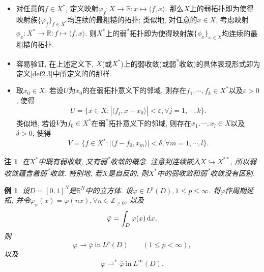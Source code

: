 \documentclass[12pt,a4paper]{article}
\newtheorem{example}[theorem]{例}
\newtheorem{remark}[theorem]{注}
\begin{document}
\begin{itemize}
    \item 对任意的$f \in X^*$, 定义映射$\varphi_f\colon X \rightarrow \mathbb{R}\colon x \mapsto \langle f, x\rangle$.
    那么$X$上的弱拓扑即为使得映射族$\{\varphi_f\}_{f \in X^*}$均连续的最粗糙的拓扑; 类似地, 对任意的$x \in X$, 考虑映射$\phi_x\colon X^* \rightarrow \mathbb{R}\colon f \mapsto \langle f, x\rangle$.
    则$X^*$上的弱\textsuperscript{*}拓扑即为使得映射族$\{\phi_x\}_{x \in X}$均连续的最粗糙的拓扑.
    \item 容易验证, 在上述定义下, $X$(或$X^*$)上的弱收敛(或弱\textsuperscript{*}收敛)的具体表现形式即为定义\ref{def2.3}中所定义的的那样.
    \item 取$x_0 \in X$, 若设$U$为$x_0$的在弱拓扑意义下的邻域, 则存在$f_1, \cdots, f_k \in X^*$以及$\varepsilon > 0$, 使得 
    \begin{equation*}
        U = \{x \in X\colon |\langle f_j, x - x_0\rangle| < \varepsilon, \forall j = 1, \cdots, k\}.
    \end{equation*}
    类似地, 若设$V$为$f_0 \in X^*$在弱\textsuperscript{*}拓扑意义下的邻域, 则存在$x_1, \cdots, x_l \in X$以及$\delta > 0$, 使得 
    \begin{equation*}
        V = \{f \in X^*\colon |\langle f - f_0, x_m\rangle| < \delta, \forall m = 1, \cdots, l\}.
    \end{equation*}
\end{itemize}

\begin{remark}
    在$X^*$中既有弱收敛, 又有弱\textsuperscript{*}收敛的概念. 注意到连续嵌入$X \hookrightarrow  X^{**}$, 所以弱收敛蕴含着弱\textsuperscript{*}收敛.
    特别地, 若$X$是自反的, 则$X^*$中的弱收敛和弱\textsuperscript{*}收敛没有区别.
\end{remark}

\begin{example}\label{ex2.5}
    设$D = [0, 1]^N$是$\mathbb{R}^N$中的立方体. 设$\varphi \in L^p(D), 1 \leq p \leq \infty$.
    将$\varphi$作周期延拓, 并令$\varphi_n(x) = \varphi(nx), \forall n \in \mathbb{Z}_{\geq 0}$, 以及 
    \begin{equation*}
        \bar{\varphi} = \int_D\varphi(x) \,{\rm d}x,
    \end{equation*}
    则
    \begin{equation*}
        \varphi \rightharpoonup \bar{\varphi} \ \text{in}\ L^p(D) \qquad (1 \leq p < \infty),
    \end{equation*}
    以及 
    \begin{equation*}
        \varphi \rightharpoonup^* \bar{\varphi}\ \text{in}\ L^{\infty}(D).
    \end{equation*}
\end{example}
\end{document}
